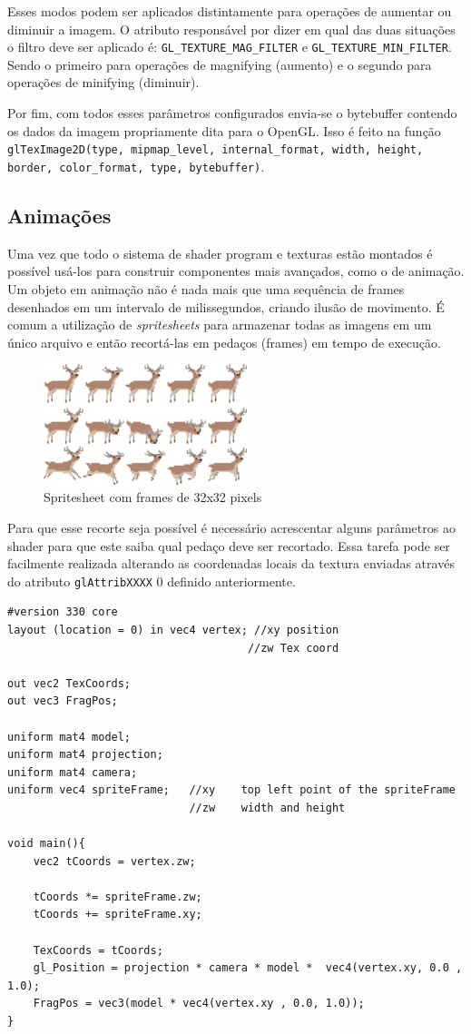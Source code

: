 \documentclass[12pt, 
openright, 
oneside, 
a4paper,    
brazil]{facom-ufu-abntex2}
\begin{document}
Esses modos podem ser aplicados distintamente para operações de aumentar ou diminuir a imagem. O atributo responsável por dizer em qual das duas situações o filtro deve ser aplicado é: \texttt{GL_TEXTURE_MAG_FILTER} e \texttt{GL_TEXTURE_MIN_FILTER}. Sendo o primeiro para operações de magnifying (aumento) e o segundo para operações de minifying (diminuir).

Por fim, com todos esses parâmetros configurados envia-se o bytebuffer contendo os dados da imagem propriamente dita para o OpenGL. Isso é feito na função \texttt{glTexImage2D(type, mipmap_level, internal_format, width, height, border, color_format, type, bytebuffer)}.

\subsection{Animações}
Uma vez que todo o sistema de shader program e texturas estão montados é possível usá-los para construir componentes mais avançados, como o de animação. Um objeto em animação não é nada mais que uma sequência de frames desenhados em um intervalo de milissegundos, criando ilusão de movimento. É comum a utilização de \textit{spritesheets} para armazenar todas as imagens em um único arquivo e então recortá-las em pedaços (frames) em tempo de execução.

\begin{figure}[H]
	\centering
	\includegraphics[width=16em]{imagens/spritesheet.png}
	\caption{Spritesheet com frames de 32x32 pixels}
\end{figure}
Para que esse recorte seja possível é necessário acrescentar alguns parâmetros ao shader para que este saiba qual pedaço deve ser recortado. Essa tarefa pode ser facilmente realizada alterando as coordenadas locais da textura enviadas através do atributo \texttt{glAttribXXXX} 0 definido anteriormente.


\begin{lstlisting}[caption=Vertex shader com animações]
#version 330 core
layout (location = 0) in vec4 vertex; //xy position
									 //zw Tex coord

out vec2 TexCoords;
out vec3 FragPos;

uniform mat4 model;
uniform mat4 projection;
uniform mat4 camera;
uniform vec4 spriteFrame; 	//xy 	top left point of the spriteFrame
							//zw	width and height

void main(){
	vec2 tCoords = vertex.zw;

	tCoords *= spriteFrame.zw;
	tCoords += spriteFrame.xy;

	TexCoords = tCoords;
	gl_Position = projection * camera * model *  vec4(vertex.xy, 0.0 , 1.0);
	FragPos = vec3(model * vec4(vertex.xy , 0.0, 1.0));
}

\end{lstlisting}
\end{document}
